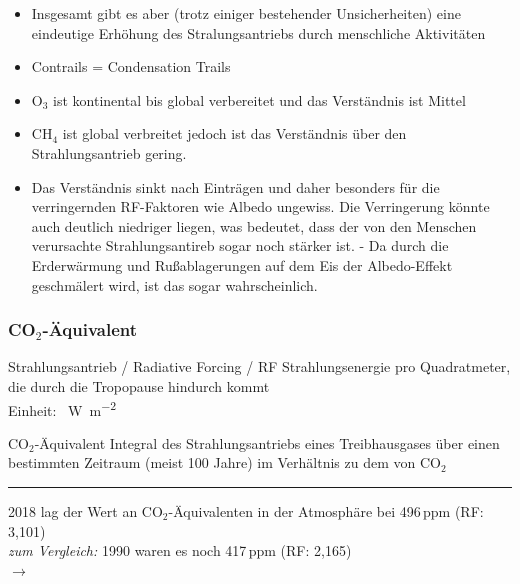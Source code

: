 \begin{frame}
{\begin{itemize}
   	\item[] Insgesamt gibt es aber (trotz einiger bestehender Unsicherheiten) eine eindeutige Erhöhung des Stralungsantriebs durch menschliche Aktivitäten
    \item[] Contrails = Condensation Trails
    \item[] O$_3$ ist kontinental bis global verbereitet und das Verständnis ist Mittel
  	\item[] CH$_4$ ist global verbreitet jedoch ist das Verständnis über den Strahlungsantrieb gering.
  	\item[] Das Verständnis sinkt nach Einträgen und daher besonders für die verringernden RF-Faktoren wie Albedo ungewiss. Die Verringerung könnte auch deutlich niedriger liegen, was bedeutet, dass der von den Menschen verursachte Strahlungsantireb sogar noch stärker ist. - Da durch die Erderwärmung und Rußablagerungen auf dem Eis der Albedo-Effekt geschmälert wird, ist das sogar wahrscheinlich.
  \end{itemize}
  }
\end{frame}


\begin{frame}
	\frametitle{CO$_2$-Äquivalent}

	\begin{block}{Strahlungsantrieb / Radiative Forcing / RF}
		Strahlungsenergie pro Quadratmeter, die durch die Tropopause hindurch kommt \\
		Einheit: \SI{}{\watt\per\square\meter}
	\end{block}

	\begin{block}{CO$_2$-Äquivalent}
		Integral des Strahlungsantriebs eines Treibhausgases über einen bestimmten Zeitraum (meist 100 Jahre) im Verhältnis zu dem von CO$_2$

	\end{block}


	\color{gray}\rule{\linewidth}{1pt}

	\color{black}

	2018 lag der Wert an CO$_2$-Äquivalenten in der Atmosphäre bei 496\,ppm (RF: 3,101)\\
	\textit{zum Vergleich: } 1990 waren es noch 417\,ppm (RF: 2,165)\\
	$\rightarrow$ \color{red}{Zuwachs des Strahlungsantriebs um 43\,\% seit 1990}
\end{frame}

